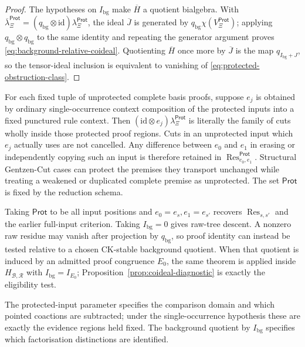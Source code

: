 \documentclass[10pt,a4paper]{article}
\theoremstyle{plain}
\theoremstyle{definition}
\theoremstyle{remark}
\newcommand{\Base}{\mathcal B}
\newcommand{\Rules}{\mathcal R}
\newcommand{\Hlic}{H_{\Base,\Rules}}
\begin{document}
\begin{proof}
The hypotheses on \(I_{\mathrm{bg}}\) make \(\overline H\) a quotient
bialgebra.  With
\(\overline\lambda_\Xi^{\mathsf{Prot}}
 =(q_{\mathrm{bg}}\otimes\mathrm{id})\lambda_\Xi^{\mathsf{Prot}}\),
the ideal \(\overline J\) is generated by
\(q_{\mathrm{bg}}\chi(V_\Xi^{\mathsf{Prot}})\); applying
\(q_{\mathrm{bg}}\otimes q_{\mathrm{bg}}\) to the same identity and repeating the generator argument
proves \eqref{eq:background-relative-coideal}.  Quotienting
\(\overline H\) once more by \(\overline J\) is the map
\(q_{I_{\mathrm{bg}}+J}\), so
the tensor-ideal inclusion is equivalent to vanishing of
\eqref{eq:protected-obstruction-class}.
\end{proof}

For each fixed tuple of unprotected complete basis proofs, suppose \(e_j\)
is obtained by ordinary single-occurrence context composition of the protected inputs
into a fixed punctured rule context.  Then
\((\mathrm{id}\otimes e_j)\lambda_\Xi^{\mathsf{Prot}}\) is literally the family of
cuts wholly inside those protected proof regions.  Cuts in an
unprotected input which \(e_j\) actually uses are not cancelled.  Any
difference between \(e_0\) and \(e_1\) in erasing or independently copying
such an input is therefore retained in
\(\operatorname{Res}_{e_0,e_1}^{\mathsf{Prot}}\).
Structural Gentzen-Cut cases can protect the premises they transport
unchanged while treating a weakened or duplicated complete premise as
unprotected.  The set \(\mathsf{Prot}\) is fixed by the reduction schema.

Taking \(\mathsf{Prot}\) to be all input positions and
\(e_0=e_s,e_1=e_{s'}\) recovers
\(\operatorname{Res}_{s,s'}\) and the earlier full-input criterion.  Taking
\(I_{\mathrm{bg}}=0\) gives raw-tree descent.  A nonzero raw residue may
vanish after projection by \(q_{\mathrm{bg}}\), so proof identity can
instead be tested relative to a chosen CK-stable background quotient.  When
that quotient is induced by an admitted
proof congruence \(E_0\), the same theorem is applied inside \(\Hlic\) with
\(I_{\mathrm{bg}}=I_{E_0}\); Proposition~\ref{prop:coideal-diagnostic} is exactly the
eligibility test.

The protected-input parameter specifies the comparison domain and which
pointed coactions are subtracted; under the single-occurrence hypothesis
these are exactly the evidence regions held fixed.  The background
quotient by \(I_{\mathrm{bg}}\) specifies which factorisation distinctions
are identified.
\end{document}
